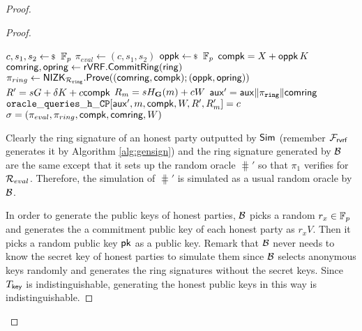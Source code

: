 \begin{proof}
\begin{proof}
			
			\begin{algorithm}
				\caption{$\gen_{sign}(\ring,W,\{X,\pk\},\aux,m)$}
				\label{alg:gensignbdv}	 	
				\begin{algorithmic}[1]
					\State $ c,s_1, s_2 \leftsample \FF_p $
					\State $ \pi_{eval}  \leftarrow (c,s_1, s_2)$
					\State $ \openpk \leftsample \FF_p $
					\State $ \mathsf{compk} =  X + \mathsf{oppk} \, K$
					\State $ \mathsf{comring}, \mathsf{opring} \leftarrow {\ensuremath{\mathsf{rVRF}}}.{\mathsf{CommitRing}}(\mathsf{ring}) $
					\State $ \pi_{ring} \leftarrow {\ensuremath{\mathsf{NIZK}}}_{\mathcal{R}_{\mathtt{ring}}}.{\mathsf{Prove}}((\mathsf{comring}, \mathsf{compk}); (\mathsf{oppk}, \mathsf{opring})) $ 
					\State $ R' = sG +\delta K + c\mathsf{compk}$
					\State $ R_m = sH_{\mathbf{G}}(m) + c W $
					\State $ \mathsf{aux}' = \mathsf{aux} \| \pi_{\mathtt{ring}} \| \mathsf{comring} $
					\State $ \mathtt{oracle\_queries\_h\_CP}[\mathsf{aux}',m, \mathsf{compk},W,R',R'_m] = c$						
					\State\Return$ \sigma = (\pi_{eval},\pi_{ring},\mathsf{compk},\mathsf{comring},W) $
				\end{algorithmic}
				
			\end{algorithm}
			
			
			Clearly the ring signature of an honest party outputted by $ \mathsf{Sim} $ (remember $ \mathcal{F}_{\textsf{rvrf}}$ generates it by Algorithm \ref{alg:gensign}) and the ring signature generated by $ \mathcal{B} $ are the same except that it sets up the random oracle $ \hash' $ so that $ \pi_1 $ verifies for $ \mathcal{R}_{eval} $. Therefore, the simulation of $ \hash' $ is simulated as a usual random oracle by $ \mathcal{B} $.
			
			In order to generate the public keys of honest parties, $ \mathcal{B} $ picks a random $ r_x\in \mathbb{F}_p $ and generates the a commitment public key of each honest party as $ r_xV$. Then it picks a random public key $ \mathsf{pk} $ as a public key.
			Remark that $ \mathcal{B}$  never needs to know the secret key of honest parties to simulate them since $ \mathcal{B} $ selects anonymous keys randomly  and generates the ring signatures  without the secret keys. Since $ T_{\mathsf{key}} $ is indistinguishable, generating the honest public keys in this way is indistinguishable. 			
			

\end{proof}
\end{proof}
